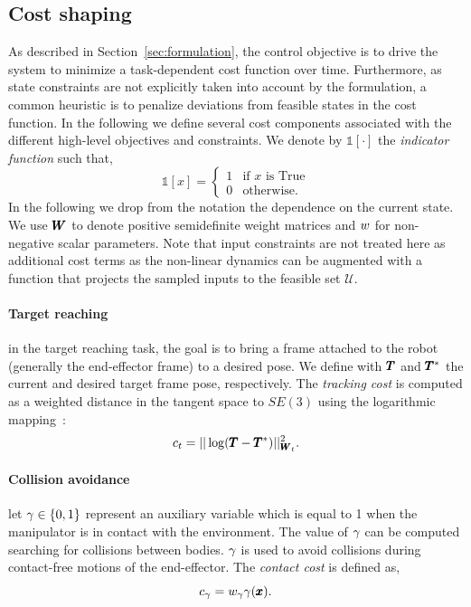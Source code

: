 \subsection{Cost shaping}
As described in Section~\ref{sec:formulation}, the control objective is to drive the system to minimize a task-dependent cost function over time. Furthermore, as state constraints are not explicitly taken into account by the formulation, a common heuristic is to penalize deviations from feasible states in the cost function. In the following we define several cost components associated with the different high-level objectives and constraints.
We denote by $\mathds{1}[\cdot]$ the \textit{indicator function} such that,
\begin{equation}
    \mathds{1}[x] = 
    \begin{cases}
    1 & \text{if } x \text{ is True} \\
    0 & \text{otherwise}.
    \end{cases}
\end{equation}
In the following we drop from the notation the dependence on the current state. We use $\pmb{W}_{}$ to denote positive semidefinite weight matrices and $w_{}$ for non-negative scalar parameters. Note that input constraints are not treated here as additional cost terms as the non-linear dynamics can be augmented with a function that projects the sampled inputs to the feasible set $\mathcal{U}$.

\paragraph{Target reaching} in the target reaching task, the goal is to bring a frame attached to the robot (generally the end-effector frame) to a desired pose. We define with $\pmb{T}$ and $\pmb{T}^*$ the current and desired target frame pose, respectively. The \textit{tracking cost} is computed as a weighted distance in the tangent space to $SE(3)$ using the logarithmic mapping~\cite{blanco2010tutorial}:
\begin{equation} \label{eq:tracking_cost}
     c_{t} = || \log(\pmb{T} - \pmb{T}^{*}) ||^2_{\pmb{W}_{t}}.
 \end{equation}
 
 \paragraph{Collision avoidance} let $\gamma \in \{0, 1\}$ represent an auxiliary variable which is equal to 1 when the manipulator is in contact with the environment. The value of $\gamma$ can be computed searching for collisions between bodies. 
 $\gamma$ is used to avoid collisions during contact-free motions of the end-effector. 
 The \textit{contact cost} is defined as,
 \begin{equation}
     c_{\gamma}= w_{\gamma} \gamma(\pmb{x}).
 \end{equation}

